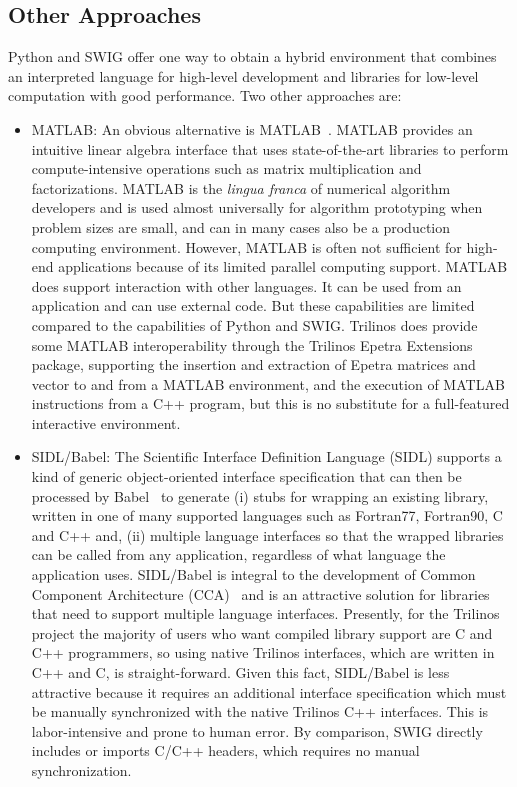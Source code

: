 \documentclass[acmtocl]{acmtrans2m}
\begin{document}
\subsection{Other Approaches}

Python and SWIG offer one way to obtain a hybrid environment that
combines an interpreted language for high-level development and
libraries for low-level computation with good performance.  Two other
approaches are:

\begin{itemize}

\item MATLAB: An obvious alternative is
  MATLAB~\cite{Matlab-home-page}.  MATLAB provides an intuitive linear
  algebra interface that uses state-of-the-art libraries to perform
  compute-intensive operations such as matrix multiplication and
  factorizations.  MATLAB is the {\it lingua franca} of numerical
  algorithm developers and is used almost universally for algorithm
  prototyping when problem sizes are small, and can in many cases also
  be a production computing environment.  However, MATLAB is often not
  sufficient for high-end applications because of its limited parallel
  computing support.  MATLAB does support interaction with other
  languages.  It can be used from an application and can use external
  code.  But these capabilities are limited compared to the
  capabilities of Python and SWIG.  Trilinos does provide some MATLAB
  interoperability through the Trilinos Epetra Extensions package,
  supporting the insertion and extraction of Epetra matrices and
  vector to and from a MATLAB environment, and the execution of MATLAB
  instructions from a C++ program, but this is no substitute for a
  full-featured interactive environment.

\item SIDL/Babel: The Scientific Interface Definition Language (SIDL)
  supports a kind of generic object-oriented interface specification
  that can then be processed by Babel~\cite{Babel-home-page} to
  generate (i) stubs for wrapping an existing library, written in one
  of many supported languages such as Fortran77, Fortran90, C and C++
  and, (ii) multiple language interfaces so that the wrapped libraries
  can be called from any application, regardless of what language the
  application uses.  SIDL/Babel is integral to the development of
  Common Component Architecture (CCA)~\cite{cca} and is an attractive
  solution for libraries that need to support multiple language
  interfaces.  Presently, for the Trilinos project the majority of
  users who want compiled library support are C and C++ programmers,
  so using native Trilinos interfaces, which are written in C++ and C,
  is straight-forward.  Given this fact, SIDL/Babel is less attractive
  because it requires an additional interface specification which must
  be manually synchronized with the native Trilinos C++ interfaces.
  This is labor-intensive and prone to human error.  By comparison,
  SWIG directly includes or imports C/C++ headers, which requires no
  manual synchronization.

\end{itemize}
\end{document}
